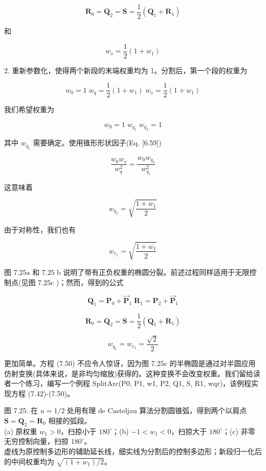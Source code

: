 \documentclass[../main.tex]{subfiles}
\begin{document}
\[
{\mathbf{R}}_{0} = {\mathbf{Q}}_{2} = \mathbf{S} = \frac{1}{2}\left( {{\mathbf{Q}}_{1} + {\mathbf{R}}_{1}}\right)  \tag{7.44}
\]

和

\[
{w}_{s} = \frac{1}{2}\left( {1 + {w}_{1}}\right)  \tag{7.45}
\]

2. 重新参数化，使得两个新段的末端权重均为 1。分割后，第一个段的权重为

\[
{w}_{0} = 1\;{w}_{q} = \frac{1}{2}\left( {1 + {w}_{1}}\right) \;{w}_{s} = \frac{1}{2}\left( {1 + {w}_{1}}\right)
\]

我们希望权重为

\[
{w}_{0} = 1\;{w}_{{q}_{1}}\;{w}_{{q}_{2}} = 1
\]

其中 \({w}_{{q}_{1}}\) 需要确定。使用锥形形状因子(Eq. [6.59])

\[
\frac{{w}_{0}{w}_{s}}{{w}_{q}^{2}} = \frac{{w}_{0}{w}_{{q}_{2}}}{{w}_{{q}_{1}}^{2}}
\]

这意味着

\[
{w}_{{q}_{1}} = \sqrt{\frac{1 + {w}_{1}}{2}} \tag{7.46}
\]

由于对称性，我们也有

\[
{w}_{{r}_{1}} = \sqrt{\frac{1 + {w}_{1}}{2}} \tag{7.47}
\]

图 \({7.25}\mathrm{a}\) 和 \({7.25}\mathrm{\;b}\) 说明了带有正负权重的椭圆分裂。前述过程同样适用于无限控制点(见图 \({7.25}\mathrm{c}\) )；然而，得到的公式

\[
{\mathbf{Q}}_{1} = {\mathbf{P}}_{0} + {\overrightarrow{\mathbf{P}}}_{1}\;{\mathbf{R}}_{1} = {\mathbf{P}}_{2} + {\overrightarrow{\mathbf{P}}}_{1} \tag{7.48}
\]

\[
{\mathbf{R}}_{0} = {\mathbf{Q}}_{2} = \mathbf{S} = \frac{1}{2}\left( {{\mathbf{Q}}_{1} + {\mathbf{R}}_{1}}\right)  \tag{7.49}
\]

\[
{w}_{{q}_{1}} = {w}_{{r}_{1}} = \frac{\sqrt{2}}{2} \tag{7.50}
\]

更加简单。方程 (7.50) 不应令人惊讶，因为图 7.25c 的半椭圆是通过对半圆应用仿射变换(具体来说，是非均匀缩放)获得的。这种变换不会改变权重。我们留给读者一个练习，编写一个例程 SplitArc(P0, P1, w1, P2, Q1, S, R1, wqr)，该例程实现方程 (7.42)-(7.50)。

\begin{center}
\begin{minipage}{36cm}
\vspace*{.6\baselineskip}
\centering
{}
\par\vspace{.5cm}
\par\smallskip
图 7.25. 在 $u=1/2$ 处用有理 de Casteljau 算法分割圆锥弧，得到两个以肩点 $\mathbf S=\mathbf Q_2=\mathbf R_0$ 相接的弧段。\\
(a) 原权重 $w_1>0$，扫掠小于 $180^\circ$；(b) $-1<w_1<0$，扫掠大于 $180^\circ$；(c) 非零无穷控制向量，扫掠 $180^\circ$。\\
虚线为原控制多边形的辅助延长线，细实线为分割后的控制多边形；新段归一化后的中间权重均为 $\sqrt{(1+w_1)/2}$。
\end{minipage}
\end{center}
\end{document}
